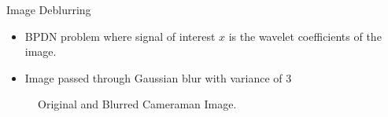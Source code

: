 \documentclass{beamer}
\begin{document}
\begin{frame}{Image Deblurring}
\begin{itemize}
    \item BPDN problem where signal of interest $x$ is the wavelet coefficients of the image.
    \item Image passed through Gaussian blur with variance of 3

    
\end{itemize}

\begin{figure}[H]
    \centering
    \caption{Original and Blurred Cameraman Image.}
    \label{fig:camera-combined}
\end{figure}

\end{frame}
\end{document}
